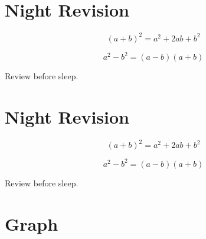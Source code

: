 \clearpage

\pagecolor{black}
\color{white}

\begin{darkpage}

\section*{Night Revision}

\[
(a+b)^2=a^2+2ab+b^2
\]

\[
a^2-b^2=(a-b)(a+b)
\]

Review before sleep.

\section*{Night Revision}

\[
(a+b)^2=a^2+2ab+b^2
\]

\[
a^2-b^2=(a-b)(a+b)
\]

Review before sleep.

\end{darkpage}

\clearpage
\nopagecolor
\color{black}


\section{Graph}

